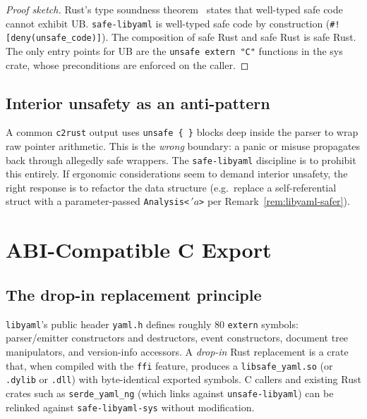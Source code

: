 \documentclass[12pt]{article}
\theoremstyle{definition}
\theoremstyle{remark}
\newcommand{\lifetime}[1]{\ensuremath{\,'\!#1}}
\begin{document}
\begin{proof}[Proof sketch]
Rust's type soundness theorem~\cite{rustbelt} states that well-typed safe
code cannot exhibit UB. \texttt{safe-libyaml} is well-typed safe code by
construction (\texttt{\#![deny(unsafe\_code)]}). The composition of safe
Rust and safe Rust is safe Rust. The only entry points for UB are the
\texttt{unsafe extern "C"} functions in the sys crate, whose preconditions
are enforced on the caller.
\end{proof}

\subsection{Interior unsafety as an anti-pattern}

A common \texttt{c2rust} output uses \texttt{unsafe \{ \}} blocks deep
inside the parser to wrap raw pointer arithmetic. This is the \emph{wrong}
boundary: a panic or misuse propagates back through allegedly safe wrappers.
The \texttt{safe-libyaml} discipline is to prohibit this entirely. If
ergonomic considerations seem to demand interior unsafety, the right
response is to refactor the data structure (e.g.\ replace a self-referential
struct with a parameter-passed \texttt{Analysis<\lifetime{a}>} per
Remark~\ref{rem:libyaml-safer}).

\section{ABI-Compatible C Export}
\label{sec:ffi}

\subsection{The drop-in replacement principle}

\texttt{libyaml}'s public header \texttt{yaml.h} defines roughly 80
\texttt{extern} symbols: parser/emitter constructors and destructors, event
constructors, document tree manipulators, and version-info accessors.
A \emph{drop-in} Rust replacement is a crate that, when compiled with the
\texttt{ffi} feature, produces a \texttt{libsafe\_yaml.so} (or \texttt{.dylib}
or \texttt{.dll}) with byte-identical exported symbols. C callers and
existing Rust crates such as \texttt{serde\_yaml\_ng} (which links against
\texttt{unsafe-libyaml}) can be relinked against \texttt{safe-libyaml-sys}
without modification.
\end{document}
